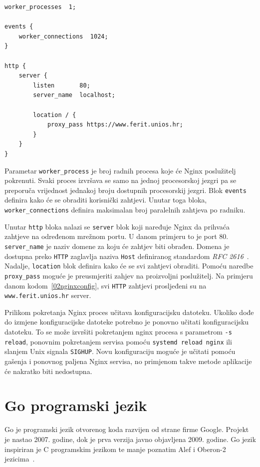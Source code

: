 \begin{lstlisting}[float=h]
worker_processes  1;

events {
    worker_connections  1024;
}

http {
    server {
        listen       80;
        server_name  localhost;

        location / {
            proxy_pass https://www.ferit.unios.hr;
        }
    }
}
\end{lstlisting}

Parametar \texttt{worker\_process} je broj radnih procesa koje će Nginx poslužitelj pokrenuti.
Svaki proces izvršava se samo na jednoj procesorskoj jezgri pa se preporuča vrijednost jednakoj
broju dostupnih procesorskij jezgri. Blok \texttt{events} definira kako će se obraditi korisnički
zahtjevi.  Unutar toga bloka, \texttt{worker\_connections} definira maksimalan broj paralelnih
zahtjeva po radniku.

Unutar \texttt{http} bloka nalazi se \texttt{server} blok koji naređuje Nginx da prihvaća zahtjeve
na određenom mrežnom portu. U danom primjeru to je port 80. \texttt{server\_name} je naziv domene
za koju će zahtjev biti obrađen. Domena je dostupna preko \texttt{HTTP} zaglavlja naziva
\texttt{Host} definiranog standardom \textit{RFC 2616}~\citep{fielding1999hypertext}. Nadalje,
\texttt{location} blok definira kako će se svi zahtjevi obraditi. Pomoću naredbe
\texttt{proxy\_pass} moguće je preusmjeriti zahjev na proizvoljni poslužitelj. Na primjeru danom
kodom~\ref{02nginxconfig}, svi \texttt{HTTP} zahtjevi prosljeđeni su na \texttt{www.ferit.unios.hr}
server.

Prilikom pokretanja Nginx proces učitava konfiguracijsku datoteku. Ukoliko dođe do izmjene
konfiguracijske datoteke potrebno je ponovno učitati konfiguracijsku datoteku. To se može izvršiti
pokretanjem nginx procesa s parametrom \texttt{-s reload}, ponovnim pokretanjem servisa pomoću
\texttt{systemd reload nginx} ili slanjem Unix signala \texttt{SIGHUP}. Novu konfiguraciju moguće je
učitati pomoću gašenja i ponovnog paljena Nginx servisa, no primjenom takve metode aplikacije će
nakratko biti nedostupna.

\section{Go programski jezik}
Go je programski jezik otvorenog koda razvijen od strane firme Google. Projekt je nastao 2007.
godine, dok je prva verzija javno objavljena 2009. godine. Go jezik inspiriran je C programskim
jezikom te manje poznatim Alef i Oberon-2 jezicima~\citep{donovan2015go}.


